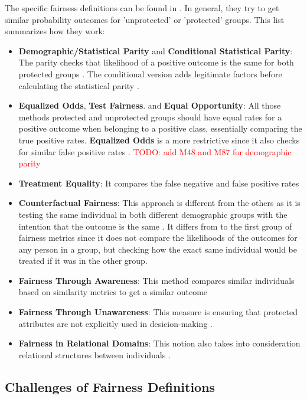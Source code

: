 \documentclass[12pt, a4paper, oneside]{book}   	%
\renewcommand{\todo}[1]{\textcolor{red}{TODO: #1}}
\begin{document}
			The specific fairness definitions can be found in \textcite{Mehrabi_2021}. In general, they try to get similar probability outcomes for 'unprotected' or 'protected' groups. This list summarizes how they work:
			\begin{itemize}
				\item \textbf{Demographic/Statistical Parity} and \textbf{Conditional Statistical Parity}: The parity checks that likelihood of a positive outcome is the same for both protected groups \autocite{Mehrabi_2021}. The conditional version adds legitimate factors before calculating the statistical parity \autocite{M41_Corbett-Davies_2017}.
				\item \textbf{Equalized Odds}, \textbf{Test Fairness}. and \textbf{Equal Opportunity}: All those methods protected and unprotected groups should have equal rates for a positive outcome when belonging to a positive class, essentially comparing the true positive rates. \textbf{Equalized Odds} is a more restrictive since it also checks for similar false positive rates \autocites{M149_Verma_2018}{Mehrabi_2021}. \todo{add M48 and M87 for demographic parity}
				\item \textbf{Treatment Equality}: It compares the false negative and false positive rates \autocite{M151_Wang_2014}
				\item \textbf{Counterfactual Fairness}: This approach is different from the others as it is testing the same individual in both different demographic groups with the intention that the outcome is the same \autocites{M87_Kusner_2017}{Mehrabi_2021}. It differs from to the first group of fairness metrics since it does not compare the likelihoods of the outcomes for any person in a group, but checking how the exact same individual would be treated if it was in the other group.
				\item \textbf{Fairness Through Awareness}: This method compares similar individuals based on similarity metrics to get a similar outcome \autocite{Mehrabi_2021}
				\item \textbf{Fairness Through Unawareness}: This measure is ensuring that protected attributes are not explicitly used in desicion-making \autocite{M61_Grgic-Hlaca_2016, M87_Kusner_2017}.
				\item \textbf{Fairness in Relational Domains}: This notion also takes into consideration relational structures between individuals \autocite{M50_Farnadi_2018}.
			\end{itemize}
			
			\subsection{Challenges of Fairness Definitions}
			
\end{document}
